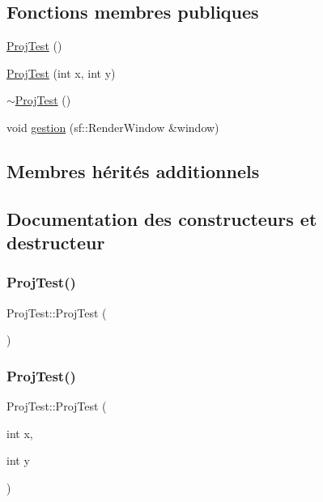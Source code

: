 \subsection*{Fonctions membres publiques}
\begin{DoxyCompactItemize}
\item 
\hyperlink{class_proj_test_a64855e6e7ef8219566ab0fde2b05a9e1}{Proj\+Test} ()
\item 
\hyperlink{class_proj_test_ae1611498a5b25d561998068205e9f77f}{Proj\+Test} (int x, int y)
\item 
\hyperlink{class_proj_test_a9bc10c512035ae9f3294179c5d2db808}{$\sim$\+Proj\+Test} ()
\item 
void \hyperlink{class_proj_test_af0b751a8e8cb0b7d10857722b691f3b6}{gestion} (sf\+::\+Render\+Window \&window)
\end{DoxyCompactItemize}
\subsection*{Membres hérités additionnels}


\subsection{Documentation des constructeurs et destructeur}
\mbox{\label{class_proj_test_a64855e6e7ef8219566ab0fde2b05a9e1}} 
\subsubsection{\texorpdfstring{Proj\+Test()}{ProjTest()}\hspace{0.1cm}{\footnotesize\ttfamily [1/2]}}
{\footnotesize\ttfamily Proj\+Test\+::\+Proj\+Test (\begin{DoxyParamCaption}{ }\end{DoxyParamCaption})}

\mbox{\label{class_proj_test_ae1611498a5b25d561998068205e9f77f}} 
\subsubsection{\texorpdfstring{Proj\+Test()}{ProjTest()}\hspace{0.1cm}{\footnotesize\ttfamily [2/2]}}
{\footnotesize\ttfamily Proj\+Test\+::\+Proj\+Test (\begin{DoxyParamCaption}\item[{int}]{x,  }\item[{int}]{y }\end{DoxyParamCaption})}

